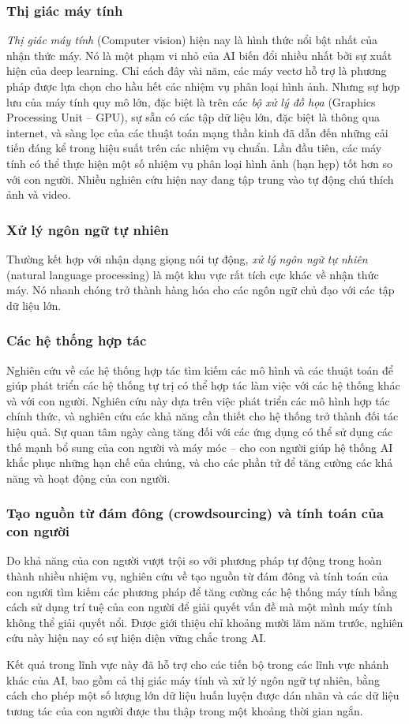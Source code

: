 \subsubsection{Thị giác máy tính}
\textit{Thị giác máy tính} (Computer vision) hiện nay là hình thức nổi bật nhất của nhận thức máy. Nó là một phạm vi nhỏ của AI biến đổi nhiều nhất bởi sự xuất hiện của deep learning. Chỉ cách đây vài năm, các máy vectơ hỗ trợ là phương pháp được lựa chọn cho hầu hết các nhiệm vụ phân loại hình ảnh. Nhưng sự hợp lưu của máy tính quy mô lớn, đặc biệt là trên các \textit{bộ xử lý đồ họa} (Graphics Processing Unit – GPU), sự sẵn có các tập dữ liệu lớn, đặc biệt là thông qua internet, và sàng lọc của các thuật toán mạng thần kinh đã dẫn đến những cải tiến đáng kể trong hiệu suất trên các nhiệm vụ chuẩn. Lần đầu tiên, các máy tính có thể thực hiện một số nhiệm vụ phân loại hình ảnh (hạn hẹp) tốt hơn so với con người. Nhiều nghiên cứu hiện nay đang tập trung vào tự động chú thích ảnh và video.
\subsubsection{Xử lý ngôn ngữ tự nhiên}
Thường kết hợp với nhận dạng giọng nói tự động, \textit{xử lý ngôn ngữ tự nhiên} (natural language processing) là một khu vực rất tích cực khác về nhận thức máy. Nó nhanh chóng trở thành hàng hóa cho các ngôn ngữ chủ đạo với các tập dữ liệu lớn.
\subsubsection{Các hệ thống hợp tác}
Nghiên cứu về các hệ thống hợp tác tìm kiếm các mô hình và các thuật toán để giúp phát triển các hệ thống tự trị có thể hợp tác làm việc với các hệ thống khác và với con người. Nghiên cứu này dựa trên việc phát triển các mô hình hợp tác chính thức, và nghiên cứu các khả năng cần thiết cho hệ thống trở thành đối tác hiệu quả. Sự quan tâm ngày càng tăng đối với các ứng dụng có thể sử dụng các thế mạnh bổ sung của con người và máy móc – cho con người giúp hệ thống AI khắc phục những hạn chế của chúng, và cho các phần tử để tăng cường các khả năng và hoạt động của con người.
\subsubsection{Tạo nguồn từ đám đông (crowdsourcing) và tính toán của con người}
Do khả năng của con người vượt trội so với phương pháp tự động trong hoàn thành nhiều nhiệm vụ, nghiên cứu về tạo nguồn từ đám đông và tính toán của con người tìm kiếm các phương pháp để tăng cường các hệ thống máy tính bằng cách sử dụng trí tuệ của con người để giải quyết vấn đề mà một mình máy tính không thể giải quyết nổi. Được giới thiệu chỉ khoảng mười lăm năm trước, nghiên cứu này hiện nay có sự hiện diện vững chắc trong AI.\par
Kết quả trong lĩnh vực này đã hỗ trợ cho các tiến bộ trong các lĩnh vực nhánh khác của AI, bao gồm cả thị giác máy tính và xử lý ngôn ngữ tự nhiên, bằng cách cho phép một số lượng lớn dữ liệu huấn luyện được dán nhãn và các dữ liệu tương tác của con người được thu thập trong một khoảng thời gian ngắn.
